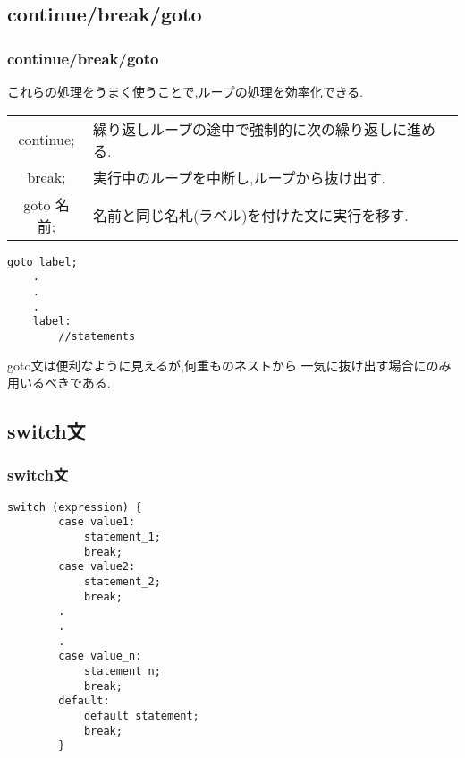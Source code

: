 \documentclass[dvipdfmx]{beamer}
\begin{document}
\subsection{continue/break/goto}
\begin{frame}[t, fragile, label=37]
    \frametitle{continue/break/goto}
    これらの処理をうまく使うことで,ループの処理を効率化できる.
    \begin{table}
    \centering
    \begin{tabular}{cl}
        \hline
        continue; & 繰り返しループの途中で強制的に次の繰り返しに進める.\\
        break; & 実行中のループを中断し,ループから抜け出す.\\
        goto 名前; & 名前と同じ名札(ラベル)を付けた文に実行を移す.\\
        \hline
    \end{tabular}
    \end{table}
    \begin{lstlisting}[gobble=3, caption=Syntax of goto statement, label=goto_howto]
    goto label;
    .
    .
    .
    label:
        //statements
    \end{lstlisting}
    goto文は便利なように見えるが,何重ものネストから
    一気に抜け出す場合にのみ用いるべきである.
    \vfill \hfill 
    \hyperlink{36}{}
    \space
    \hyperlink{38}{}
\end{frame}

\subsection{switch文}
\begin{frame}[t, fragile, label=38]
    \frametitle{switch文}
    \begin{lstlisting}[gobble=6, caption=Syntax\space of\space switch\space statement, label=switch_howto]
        switch (expression) {
        case value1:
            statement_1;
            break;
        case value2:
            statement_2;
            break;
        .
        .
        .
        case value_n:
            statement_n;
            break;
        default:
            default statement;
            break;
        }
    \end{lstlisting}
    \vfill \hfill 
    \hyperlink{37}{}
    \space
    \hyperlink{39}{}
\end{frame}
\end{document}
